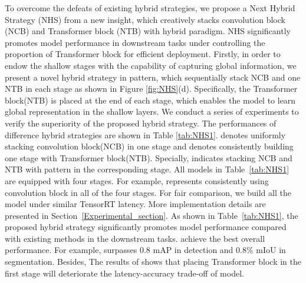 \documentclass[10pt,twocolumn,letterpaper]{article}
\begin{document}
To overcome the defeats of existing hybrid strategies, we propose a Next Hybrid Strategy (NHS) from a new insight, which creatively stacks convolution block (NCB) and Transformer block (NTB) with  hybrid paradigm. NHS significantly promotes model performance in downstream tasks under controlling the proportion of Transformer block for efficient deployment.
Firstly, in order to endow the shallow stages with the capability of capturing global information, we present a novel hybrid strategy in  pattern, which sequentially stack  NCB and one NTB in each stage as shown in Figure \ref{fig:NHS}(d). Specifically, the Transformer block(NTB) is placed at the end of each stage, which enables the model to learn global representation in the shallow layers. 
We conduct a series of experiments to verify the superiority of the proposed hybrid strategy. The performances of difference hybrid strategies are shown in Table \ref{tab:NHS1}.  denotes uniformly stacking convolution block(NCB) in one stage and  denotes consistently building one stage with Transformer block(NTB). Specially,  indicates stacking NCB and NTB with  pattern in the corresponding stage. All models in Table~\ref{tab:NHS1} are equipped with four stages. For example,  represents consistently using convolution block in all of the four stages. For fair comparison, we build all the model under similar TensorRT latency. More implementation details are presented in Section~\ref{Experimental_section}.
As shown in Table~\ref{tab:NHS1}, the proposed hybrid strategy significantly promotes model performance compared with existing methods in the downstream tasks.  achieve the best overall performance. For example,  surpasses  0.8 mAP in detection and 0.8\% mIoU in segmentation. Besides, The results of  shows that placing Transformer block in the first stage will deteriorate the latency-accuracy trade-off of model.
\end{document}
